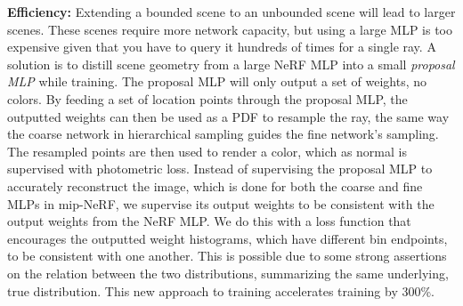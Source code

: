 \textbf{Efficiency:}
Extending a bounded scene to an unbounded scene will lead to larger scenes. These scenes require more network capacity, but using a large MLP is too expensive given that you have to query it hundreds of times for a single ray. A solution is to distill scene geometry from a large NeRF MLP into a small \textit{proposal MLP} while training. The proposal MLP will only output a set of weights, no colors. By feeding a set of location points through the proposal MLP, the outputted weights can then be used as a PDF to resample the ray, the same way the coarse network in hierarchical sampling guides the fine network's sampling. The resampled points are then used to render a color, which as normal is supervised with photometric loss. Instead of supervising the proposal MLP to accurately reconstruct the image, which is done for both the coarse and fine MLPs in mip-NeRF, we supervise its output weights to be consistent with the output weights from the NeRF MLP. We do this with a loss function that encourages the outputted weight histograms, which have different bin endpoints, to be consistent with one another. This is possible due to some strong assertions on the relation between the two distributions, summarizing the same underlying, true distribution. This new approach to training accelerates training by 300\%.



